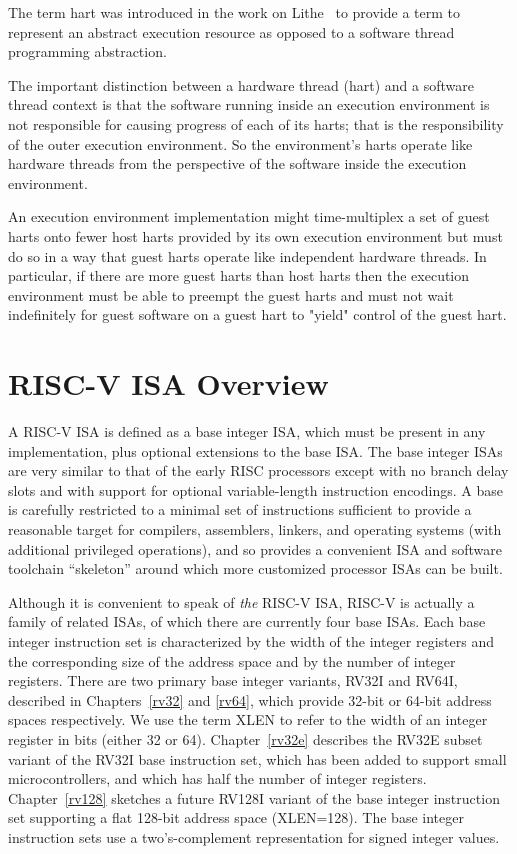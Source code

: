 \begin{commentary}
The term hart was introduced in the work on
Lithe~\cite{lithe-pan-hotpar09,lithe-pan-pldi10} to provide a term to
represent an abstract execution resource as opposed to a software
thread programming abstraction.

The important distinction between a hardware thread (hart) and a
software thread context is that the software running inside an
execution environment is not responsible for causing progress of each
of its harts; that is the responsibility of the outer execution
environment.  So the environment's harts operate like hardware threads
from the perspective of the software inside the execution environment.

An execution environment implementation might time-multiplex a set of
guest harts onto fewer host harts provided by its own execution
environment but must do so in a way that guest harts operate like
independent hardware threads.  In particular, if there are more guest
harts than host harts then the execution environment must be able to
preempt the guest harts and must not wait indefinitely for guest
software on a guest hart to "yield" control of the guest hart.
\end{commentary}

\section{RISC-V ISA Overview}

A RISC-V ISA is defined as a base integer ISA, which must be present
in any implementation, plus optional extensions to the base ISA.  The
base integer ISAs are very similar to that of the early RISC processors
except with no branch delay slots and with support for optional
variable-length instruction encodings.  A base is carefully
restricted to a minimal set of instructions sufficient to provide a
reasonable target for compilers, assemblers, linkers, and operating
systems (with additional privileged operations), and so provides
a convenient ISA and software toolchain ``skeleton'' around which more
customized processor ISAs can be built.

Although it is convenient to speak of {\em the} RISC-V ISA, RISC-V is
actually a family of related ISAs, of which there are currently four
base ISAs.  Each base integer instruction set is characterized by the
width of the integer registers and the corresponding size of the
address space and by the number of integer registers.  There are two
primary base integer variants, RV32I and RV64I, described in
Chapters~\ref{rv32} and \ref{rv64}, which provide 32-bit or 64-bit
address spaces respectively.  We use the term XLEN to refer to the
width of an integer register in bits (either 32 or 64).
Chapter~\ref{rv32e} describes the RV32E subset variant of the RV32I
base instruction set, which has been added to support small
microcontrollers, and which has half the number of integer registers.
Chapter~\ref{rv128} sketches a future RV128I variant of the base
integer instruction set supporting a flat 128-bit address space
(XLEN=128).  The base integer instruction sets use a two's-complement
representation for signed integer values.

